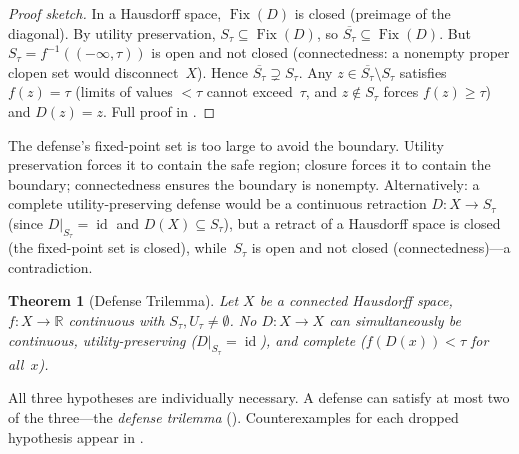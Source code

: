 \documentclass{article}
\newtheorem{theorem}{Theorem}[section]
\newcommand{\R}{\mathbb{R}}
\newcommand{\cl}[1]{\overline{#1}}
\newcommand{\Fix}{\operatorname{Fix}}
\newcommand{\id}{\operatorname{id}}
\begin{document}
\begin{proof}[Proof sketch]
In a Hausdorff space, $\Fix(D)$ is closed (preimage of the diagonal).
By utility preservation, $S_\tau \subseteq \Fix(D)$, so
$\cl{S_\tau} \subseteq \Fix(D)$. But $S_\tau = f^{-1}((-\infty,\tau))$
is open and not closed (connectedness: a nonempty proper clopen set
would disconnect~$X$). Hence $\cl{S_\tau} \supsetneq S_\tau$. Any
$z \in \cl{S_\tau}\setminus S_\tau$ satisfies $f(z) = \tau$ (limits of
values ${<}\tau$ cannot exceed~$\tau$, and $z \notin S_\tau$ forces
$f(z) \geq \tau$) and $D(z) = z$. Full proof in .
\end{proof}

The defense's fixed-point set is too large to avoid the
boundary. Utility preservation forces it to contain the safe region;
closure forces it to contain the boundary; connectedness ensures the
boundary is nonempty. Alternatively: a complete utility-preserving
defense would be a continuous retraction $D\colon X \to S_\tau$
(since $D|_{S_\tau} = \id$ and $D(X) \subseteq S_\tau$), but a
retract of a Hausdorff space is closed (the fixed-point set is
closed), while~$S_\tau$ is open and not closed
(connectedness)---a contradiction.

\begin{theorem}[Defense Trilemma]
\label{thm:trilemma}
Let $X$ be a connected Hausdorff space, $f\colon X \to \R$ continuous
with $S_\tau, U_\tau \neq \emptyset$. No $D\colon X \to X$ can
simultaneously be continuous, utility-preserving ($D|_{S_\tau} = \id$),
and complete ($f(D(x)) < \tau$ for all~$x$).
\end{theorem}

All three hypotheses are individually necessary. A defense can satisfy
at most two of the three---the \emph{defense trilemma}
(). Counterexamples for each dropped hypothesis
appear in .
\end{document}
